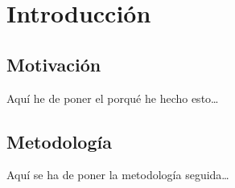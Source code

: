 \chapter{Introducción}

\section{Motivación}

Aquí he de poner el porqué he hecho esto\dots

\section{Metodología}

Aquí se ha de poner la metodología seguida\dots
